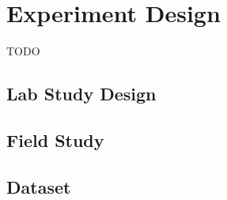\section{Experiment Design}

TODO

\subsection{Lab Study Design}

\subsection{Field Study}

\subsection{Dataset}


\cleardoublepage